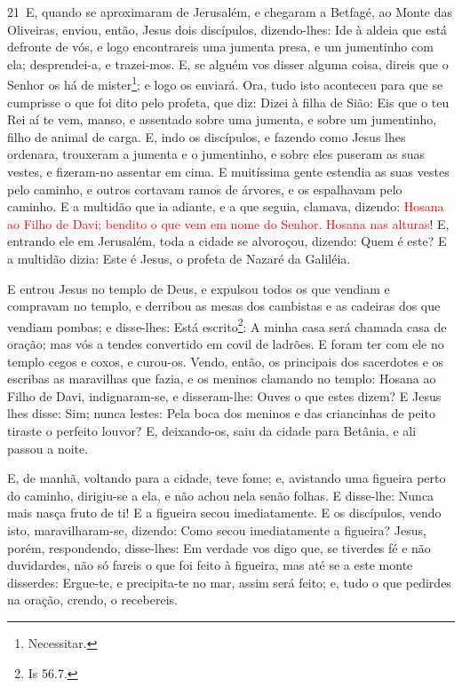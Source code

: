 \lettrine{21}\ E, quando se aproximaram de Jerusalém, e
chegaram a Betfagé, ao Monte das Oliveiras, enviou, então, Jesus
dois discípulos, dizendo-lhes: Ide à aldeia que está defronte de
vós, e logo encontrareis uma jumenta presa, e um jumentinho com ela;
desprendei-a, e trazei-mos. E, se alguém vos disser alguma
coisa, direis que o Senhor os há de mister\footnote{Necessitar.}; e
logo os enviará. Ora, tudo isto aconteceu para que se cumprisse
o que foi dito pelo profeta, que diz: Dizei à filha de Sião: Eis
que o teu Rei aí te vem, manso, e assentado sobre uma jumenta, e
sobre um jumentinho, filho de animal de carga. E, indo os
discípulos, e fazendo como Jesus lhes ordenara, trouxeram a
jumenta e o jumentinho, e sobre eles puseram as suas vestes, e
fizeram-no assentar em cima. E muitíssima gente estendia as suas
vestes pelo caminho, e outros cortavam ramos de árvores, e os
espalhavam pelo caminho. E a multidão que ia adiante, e a que
seguia, clamava, dizendo: \textcolor{red}{Hosana ao Filho de Davi; bendito o
que vem em nome do Senhor. Hosana nas alturas}! E, entrando
ele em Jerusalém, toda a cidade se alvoroçou, dizendo: Quem é este?
E a multidão dizia: Este é Jesus, o profeta de Nazaré da
Galiléia.

E entrou Jesus no templo de Deus, e expulsou todos os que vendiam
e compravam no templo, e derribou as mesas dos cambistas e as
cadeiras dos que vendiam pombas; e disse-lhes: Está
escrito\footnote{Is 56.7.}: A minha casa será chamada casa de
oração; mas vós a tendes convertido em covil de ladrões. E
foram ter com ele no templo cegos e coxos, e curou-os. Vendo,
então, os principais dos sacerdotes e os escribas as maravilhas que
fazia, e os meninos clamando no templo: Hosana ao Filho de Davi,
indignaram-se, e disseram-lhe: Ouves o que estes dizem? E
Jesus lhes disse: Sim; nunca lestes: Pela boca dos meninos e das
criancinhas de peito tiraste o perfeito louvor? E,
deixando-os, saiu da cidade para Betânia, e ali passou a noite.

E, de manhã, voltando para a cidade, teve fome; e,
avistando uma figueira perto do caminho, dirigiu-se a ela, e não
achou nela senão folhas. E disse-lhe: Nunca mais nasça fruto de ti!
E a figueira secou imediatamente. E os discípulos, vendo
isto, maravilharam-se, dizendo: Como secou imediatamente a figueira?
Jesus, porém, respondendo, disse-lhes: Em verdade vos digo
que, se tiverdes fé e não duvidardes, não só fareis o que foi feito
à figueira, mas até se a este monte disserdes: Ergue-te, e
precipita-te no mar, assim será feito; e, tudo o que pedirdes
na oração, crendo, o recebereis.

